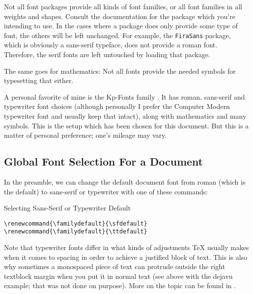 \documentclass[a4paper,oneside,11pt]{article}
\newcommand\code[1]{\texttt{#1}}
\begin{document}
Not all font packages provide all kinds of font families, or all font families
in all  weights and  shapes. Consult the documentation  for the  package which
you're  intending to  use. In  the cases  where a  package  does only  provide
some  type of  font,  the  others will  be  left  unchanged. For example,  the
\code{FiraSans} package,  which is obviously  a sans-serif typeface,  does not
provide a roman font. Therefore, the serif fonts are left untouched by loading
that package.

The same  goes for mathematics: Not all  fonts provide the needed  symbols for
typesetting that either.

A personal  favorite of mine  is the Kp-Fonts family  \cite{ctan:kpfonts}.  It
has  roman, sans-serif  and  typewriter font  choices  (although personally  I
prefer  the Computer  Modern typewriter  font and  usually keep  that intact),
along with  mathematics and  many symbols. This  is the  setup which  has been
chosen for this  document. But this is a matter of  personal preference; one's
mileage may vary.


\subsection{Global Font Selection For a Document}
\label{subsec:fontsel:global}


In the preamble, we can change the  default document font from roman (which is
the default) to sans-serif or typewriter with one of these commands:

\begin{titled-frame}
{\textsf{Selecting Sans-Serif or Typewriter Default}}
\vspace{-1em}
\begin{verbatim}
\renewcommand{\familydefault}{\sfdefault}
\renewcommand{\familydefault}{\ttdefault}
\end{verbatim}
\vspace{-1em}
\end{titled-frame}

Note that typewriter fonts differ in  what kinds of adjustments \TeX{} usually
makes  when it  comes to  spacing in  order to  achieve a  justified block  of
text. This  is also  why sometimes  a monospaced  piece of  text can  protrude
outside the right textblock  margin when you put it in  normal text (see above
with the dejavu example; that was not  done on purpose). More on the topic can
be found in \cite{texblog:typewriter}.
\end{document}
